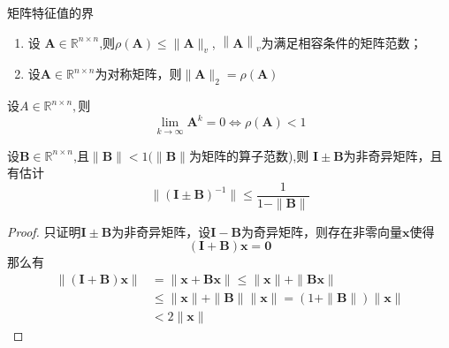 \begin{note}
    矩阵特征值的界
    \begin{enumerate}
        \item 设 $\boldsymbol{A}\in \mathbb{R} ^{n\times n}$,则$\rho(\boldsymbol{A})\leq\parallel \boldsymbol{A}\parallel_v$,
        $\left\|\boldsymbol{A}\right\|_v$为满足相容条件的矩阵范数；
        \item 设$\boldsymbol{A}\in\mathbb{R}^{n\times n}$为对称矩阵，则$\|\boldsymbol{A}\|_2=\rho(\boldsymbol{A})$
    \end{enumerate}
\end{note}
\begin{theorem}
    设$A\in\mathbb{R}^{n\times n},$则
    \[
        \operatorname*{lim}_{k\to\infty}\boldsymbol{A}^{k}=0\Leftrightarrow\rho(\boldsymbol{A})<1
    \]
\end{theorem}
\begin{theorem}
    设$\boldsymbol{B}\in\mathbb{R}^{n\times n}$,且$\parallel \boldsymbol{B}\parallel<1(\parallel \boldsymbol{B}\parallel$为矩阵的算子范数),则 $\boldsymbol{I}\pm \boldsymbol{B}$为非奇异矩阵，且有估计
    \[
        \|(\boldsymbol{I}\pm \boldsymbol{B})^{-1}\|\leq\frac{1}{1-\|\boldsymbol{B}\|}
    \]
\end{theorem}
\begin{proof}
    只证明$\boldsymbol{I}\pm \boldsymbol{B}$为非奇异矩阵，设$\boldsymbol{I}-\boldsymbol{B}$为奇异矩阵，则存在非零向量$\boldsymbol{x}$使得
    \[
        (\boldsymbol{I}+\boldsymbol{B})\boldsymbol{x} = \boldsymbol{0}
    \]
    那么有
    \[
        \begin{aligned}
            \|(\boldsymbol{I}+\boldsymbol{B})\boldsymbol{x}\|&= \|\boldsymbol{x}+\boldsymbol{B}\boldsymbol{x}\|\leq \|\boldsymbol{x}\| + \|\boldsymbol{B}\boldsymbol{x}\|\\
            &\leq \|\boldsymbol{x}\| + \|\boldsymbol{B}\|\|\boldsymbol{x}\| =(1+\|\boldsymbol{B}\|)\|\boldsymbol{x}\|\\
            &<2\|\boldsymbol{x}\|
        \end{aligned}
    \]
\end{proof}
